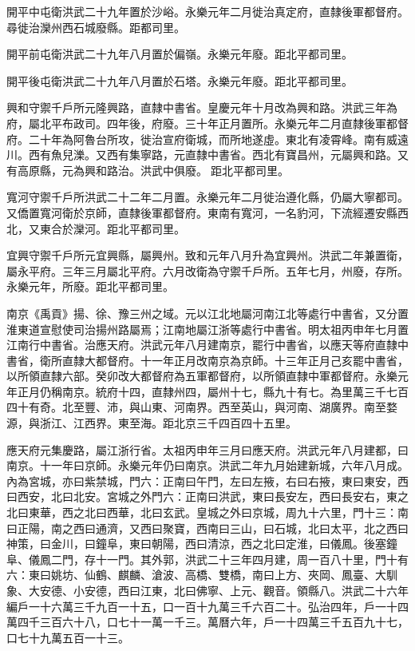 開平中屯衛洪武二十九年置於沙峪。永樂元年二月徙治真定府，直隸後軍都督府。尋徙治灤州西石城廢縣。距都司里。

開平前屯衛洪武二十九年八月置於偏嶺。永樂元年廢。距北平都司里。

開平後屯衛洪武二十九年八月置於石塔。永樂元年廢。距北平都司里。

興和守禦千戶所元隆興路，直隸中書省。皇慶元年十月改為興和路。洪武三年為府，屬北平布政司。四年後，府廢。三十年正月置所。永樂元年二月直隸後軍都督府。二十年為阿魯台所攻，徙治宣府衛城，而所地遂虛。東北有凌霄峰。南有威遠川。西有魚兒濼。又西有集寧路，元直隸中書省。西北有寶昌州，元屬興和路。又有高原縣，元為興和路治。洪武中俱廢。距北平都司里。

寬河守禦千戶所洪武二十二年二月置。永樂元年二月徙治遵化縣，仍屬大寧都司。又僑置寬河衛於京師，直隸後軍都督府。東南有寬河，一名豹河，下流經遷安縣西北，又東合於灤河。距北平都司里。

宜興守禦千戶所元宜興縣，屬興州。致和元年八月升為宜興州。洪武二年兼置衛，屬永平府。三年三月屬北平府。六月改衛為守禦千戶所。五年七月，州廢，存所。永樂元年，所廢。距北平都司里。

南京《禹貢》揚、徐、豫三州之域。元以江北地屬河南江北等處行中書省，又分置淮東道宣慰使司治揚州路屬焉；江南地屬江浙等處行中書省。明太祖丙申年七月置江南行中書省。治應天府。洪武元年八月建南京，罷行中書省，以應天等府直隸中書省，衛所直隸大都督府。十一年正月改南京為京師。十三年正月己亥罷中書省，以所領直隸六部。癸卯改大都督府為五軍都督府，以所領直隸中軍都督府。永樂元年正月仍稱南京。統府十四，直隸州四，屬州十七，縣九十有七。為里萬三千七百四十有奇。北至豐、沛，與山東、河南界。西至英山，與河南、湖廣界。南至婺源，與浙江、江西界。東至海。距北京三千四百四十五里。

應天府元集慶路，屬江浙行省。太祖丙申年三月曰應天府。洪武元年八月建都，曰南京。十一年曰京師。永樂元年仍曰南京。洪武二年九月始建新城，六年八月成。內為宮城，亦曰紫禁城，門六：正南曰午門，左曰左掖，右曰右掖，東曰東安，西曰西安，北曰北安。宮城之外門六：正南曰洪武，東曰長安左，西曰長安右，東之北曰東華，西之北曰西華，北曰玄武。皇城之外曰京城，周九十六里，門十三：南曰正陽，南之西曰通濟，又西曰聚寶，西南曰三山，曰石城，北曰太平，北之西曰神策，曰金川，曰鐘阜，東曰朝陽，西曰清涼，西之北曰定淮，曰儀鳳。後塞鐘阜、儀鳳二門，存十一門。其外郭，洪武二十三年四月建，周一百八十里，門十有六：東曰姚坊、仙鶴、麒麟、滄波、高橋、雙橋，南曰上方、夾岡、鳳臺、大馴象、大安德、小安德，西曰江東，北曰佛寧、上元、觀音。領縣八。洪武二十六年編戶一十六萬三千九百一十五，口一百十九萬三千六百二十。弘治四年，戶一十四萬四千三百六十八，口七十一萬一千三。萬曆六年，戶一十四萬三千五百九十七，口七十九萬五百一十三。

